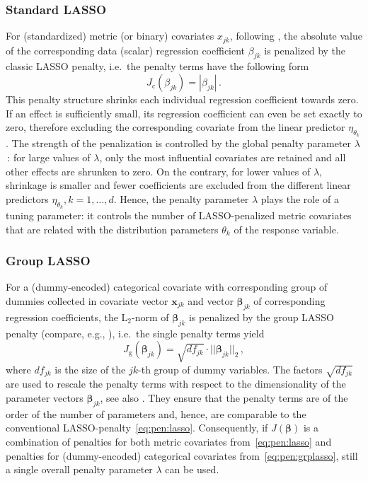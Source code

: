 \documentclass[submit]{smj}
\begin{document}
\subsubsection*{Standard LASSO}

\noindent For (standardized) metric (or binary) covariates $x_{jk}$, following \citet{Tibshirani:96}, the absolute value of the corresponding data (scalar) regression coefficient $\beta_{jk}$ is penalized by the classic LASSO penalty, i.e.\ the penalty terms have the following form
\begin{equation}\label{eq:pen:lasso}
J_{\text{c}}(\beta_{jk})= | \beta_{jk} |\,.
\end{equation}
This penalty structure shrinks each individual regression coefficient towards zero. If an effect is sufficiently small, its regression coefficient can even be set exactly to zero, therefore excluding the corresponding covariate from the linear predictor $\eta_{\theta_k}$.
The strength of the penalization is controlled by the global penalty parameter $\lambda$\,: for large values of $\lambda$, only the most influential covariates are retained and all other effects are shrunken to zero. On the contrary, for lower values of $\lambda$, shrinkage is smaller and fewer coefficients are excluded from the different linear predictors $\eta_{\theta_k}, k=1,\ldots, d$. Hence, the penalty parameter $\lambda$ plays the role of a tuning parameter: it controls the number of LASSO-penalized metric covariates that are related with the distribution parameters $\theta_k$ of the response variable.

\subsubsection*{Group LASSO}

\noindent For a (dummy-encoded) categorical covariate with corresponding group of dummies collected in covariate vector $\mathbf{x}_{jk}$ and vector $\boldsymbol{\beta}_{jk}$ of corresponding regression coefficients, the L$_2$-norm of $\boldsymbol{\beta}_{jk}$ is penalized by the group LASSO penalty (compare, e.g., \citealp{MeiGeeBue:2008}), i.e.\ the single penalty terms yield
\begin{equation}\label{eq:pen:grplasso}
J_{\text{g}}(\boldsymbol{\beta}_{jk})= \sqrt{df_{jk}}\cdot || \boldsymbol{\beta}_{jk} ||_2\,,
\end{equation}
where $df_{jk}$ is the size of the $jk$-th group of dummy variables. The factors $\sqrt{df_{jk}}$ are used to rescale the penalty terms
with respect to the dimensionality of the parameter vectors $\boldsymbol{\beta}_{jk}$, see also \citet{YuanLin:2006}.
They ensure that the penalty terms are of the
order of the number of parameters and, hence, are comparable to the conventional LASSO-penalty~\eqref{eq:pen:lasso}. Consequently,
if $J(\boldsymbol{\beta})$ is a combination of penalties for both metric covariates from~\eqref{eq:pen:lasso} and penalties for
(dummy-encoded) categorical covariates from~\eqref{eq:pen:grplasso}, still a single overall penalty parameter $\lambda$ can be used.
\end{document}

